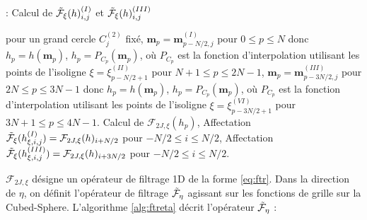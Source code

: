 \begin{center}
\begin{minipage}[H]{12cm}
  \begin{algorithm}[H]
    \caption{: Calcul de $\tilde{\mathcal{F}}_{\xi}(h)_{i,j}^{(I)}$ et $\tilde{\mathcal{F}}_{\xi}(h)_{i,j}^{(III)}$}\label{alg:ftrxi}
    \begin{algorithmic}[1]
    \State pour un grand cercle $C_j^{(2)}$ fixé,
             \State  $\mathbf{m}_p = \mathbf{m}_{p-N/2,j}^{(I)}$ pour $0  \leq p \leq N$ donc $h_p = h(\mathbf{m}_p)$,
             \State $h_p = P_{C_p}(\mathbf{m}_p)$, où $P_{C_p}$ est la fonction d'interpolation utilisant les points de l'isoligne $\xi = \xi^{(II)}_{p-N/2+1}$ pour $N+1 \leq p \leq 2N-1$,
             \State  $\mathbf{m}_p = \mathbf{m}_{p-3N/2,j}^{(III)}$ pour $2N  \leq p \leq 3N-1$ donc $h_p = h(\mathbf{m}_p)$,
             \State $h_p = P_{C_p}(\mathbf{m}_p)$, où $P_{C_p}$ est la fonction d'interpolation utilisant les points de l'isoligne $\xi = \xi^{(VI)}_{p-3N/2+1}$ pour $3N+1 \leq p \leq 4N-1$.
            \EndFor
    \State Calcul de $\mathcal{F}_{2J,\xi}(h_p)$,
    \State Affectation $\tilde{\mathcal{F}}_{\xi}(h_{\xi,i,j}^{(I)}) = \mathcal{F}_{2J,\xi}(h)_{i+N/2}$ pour $-N/2 \leq i \leq N/2$,
    \State Affectation $\tilde{\mathcal{F}}_{\xi}(h_{\xi,i,j}^{(III)}) = \mathcal{F}_{2J,\xi}(h)_{i+3N/2}$ pour $-N/2 \leq i \leq N/2$.
    \EndFor
    \end{algorithmic}
    \end{algorithm}
\end{minipage}
\end{center}
$\mathcal{F}_{2J,\xi}$ désigne un opérateur de filtrage 1D de la forme \eqref{eq:ftr}. Dans la direction de $\eta$, on définit l'opérateur de filtrage $\tilde{\mathcal{F}}_{\eta}$ agissant sur les fonctions de grille sur la Cubed-Sphere. L'algorithme \ref{alg:ftreta} décrit l'opérateur $\tilde{\mathcal{F}}_{\eta}$ :

